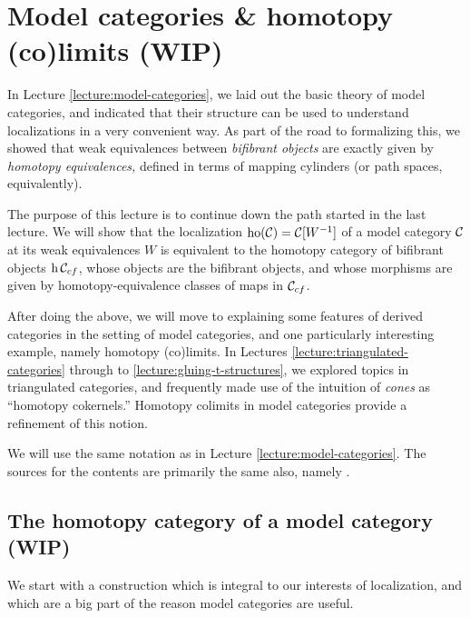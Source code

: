
\section{Model categories \& homotopy (co)limits (WIP)}\label{lecture:model-categories-and-homotopy-colimits}
In Lecture \ref{lecture:model-categories}, we laid out the basic theory of model categories, and indicated that their structure can be used to understand localizations
in a very convenient way. As part of the road to formalizing this, we showed that weak equivalences between \emph{bifibrant objects} are exactly given by
\emph{homotopy equivalences,} defined in terms of mapping cylinders (or path spaces, equivalently).

The purpose of this lecture is to continue down the path started in the last lecture. We will show that the localization \(\operatorname{ho}(\mathcal{C}) = \mathcal{C}[W^{-1}]\) of
a model category \(\mathcal{C}\) at its weak equivalences \(W\) is equivalent to the homotopy category of bifibrant objects \(\operatorname{h}{\mathcal{C}_{cf}}\), whose objects
are the bifibrant objects, and whose morphisms are given by homotopy-equivalence classes of maps in \(\mathcal{C}_{cf}\).

After doing the above, we will move to explaining some features of derived categories in the setting of model categories, and one particularly interesting example,
namely homotopy (co)limits. In Lectures \ref{lecture:triangulated-categories} through to \ref{lecture:gluing-t-structures}, we explored topics in triangulated categories,
and frequently made use of the intuition of \emph{cones} as ``homotopy cokernels.'' Homotopy colimits in model categories provide a refinement of this notion.

We will use the same notation as in Lecture \ref{lecture:model-categories}. The sources for the contents are primarily the same also, namely
\cite{cisinski-book,riehl-categorical-homotopy-theory,may-ponto-more-concise-algebraic-topology}.

\subsection{The homotopy category of a model category (WIP)}

We start with a construction which is integral to our interests of localization, and which are a big part of the reason model categories are useful.

